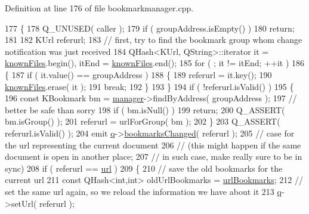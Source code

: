 Definition at line 176 of file bookmarkmanager.\+cpp.


\begin{DoxyCode}
177 \{
178     Q\_UNUSED( caller );
179     \textcolor{keywordflow}{if} ( groupAddress.isEmpty() )
180         \textcolor{keywordflow}{return};
181 
182     KUrl referurl;
183     \textcolor{comment}{// first, try to find the bookmark group whom change notification was just received}
184     QHash<KUrl, QString>::iterator it = \hyperlink{classBookmarkManager_1_1Private_ad4ef503c3bf977fc59f04ea5c89b2968}{knownFiles}.begin(), itEnd = 
      \hyperlink{classBookmarkManager_1_1Private_ad4ef503c3bf977fc59f04ea5c89b2968}{knownFiles}.end();
185     \textcolor{keywordflow}{for} ( ; it != itEnd; ++it )
186     \{
187         \textcolor{keywordflow}{if} ( it.value() == groupAddress )
188         \{
189             referurl = it.key();
190             \hyperlink{classBookmarkManager_1_1Private_ad4ef503c3bf977fc59f04ea5c89b2968}{knownFiles}.erase( it );
191             \textcolor{keywordflow}{break};
192         \}
193     \}
194     \textcolor{keywordflow}{if} ( !referurl.isValid() )
195     \{
196         \textcolor{keyword}{const} KBookmark bm = \hyperlink{classBookmarkManager_1_1Private_a18a0825534de4ad364d428c740e3692f}{manager}->findByAddress( groupAddress );
197         \textcolor{comment}{// better be safe than sorry}
198         \textcolor{keywordflow}{if} ( bm.isNull() )
199             \textcolor{keywordflow}{return};
200         Q\_ASSERT( bm.isGroup() );
201         referurl = urlForGroup( bm );
202     \}
203     Q\_ASSERT( referurl.isValid() );
204     emit \hyperlink{classBookmarkManager_1_1Private_af306f5f96c025b5b5131bdd769575cb7}{q}->\hyperlink{classOkular_1_1BookmarkManager_af46858377e563eb8277226eb853a0608}{bookmarksChanged}( referurl );
205     \textcolor{comment}{// case for the url representing the current document}
206     \textcolor{comment}{// (this might happen if the same document is open in another place;}
207     \textcolor{comment}{// in such case, make really sure to be in sync)}
208     \textcolor{keywordflow}{if} ( referurl == \hyperlink{classBookmarkManager_1_1Private_a76891cf0a4b6713612876ee2eceee94d}{url} )
209     \{
210         \textcolor{comment}{// save the old bookmarks for the current url}
211         \textcolor{keyword}{const} QHash<int,int> oldUrlBookmarks = \hyperlink{classBookmarkManager_1_1Private_a1c8a7ef1c0aa4ec956125cedf1cc9c04}{urlBookmarks};
212         \textcolor{comment}{// set the same url again, so we reload the information we have about it}
213         \hyperlink{classBookmarkManager_1_1Private_af306f5f96c025b5b5131bdd769575cb7}{q}->setUrl( referurl );

\end{DoxyCode}
